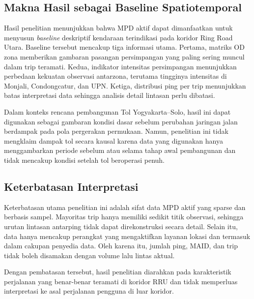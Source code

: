 \subsection{Makna Hasil sebagai Baseline Spatiotemporal}

Hasil penelitian menunjukkan bahwa MPD aktif dapat dimanfaatkan untuk menyusun \textit{baseline} deskriptif kendaraan terindikasi pada koridor Ring Road Utara. Baseline tersebut mencakup tiga informasi utama. Pertama, matriks OD zona memberikan gambaran pasangan persimpangan yang paling sering muncul dalam trip teramati. Kedua, indikator intensitas persimpangan menunjukkan perbedaan kekuatan observasi antarzona, terutama tingginya intensitas di Monjali, Condongcatur, dan UPN. Ketiga, distribusi ping per trip menunjukkan batas interpretasi data sehingga analisis detail lintasan perlu dibatasi.

Dalam konteks rencana pembangunan Tol Yogyakarta--Solo, hasil ini dapat digunakan sebagai gambaran kondisi dasar sebelum perubahan jaringan jalan berdampak pada pola pergerakan permukaan. Namun, penelitian ini tidak mengklaim dampak tol secara kausal karena data yang digunakan hanya menggambarkan periode sebelum atau selama tahap awal pembangunan dan tidak mencakup kondisi setelah tol beroperasi penuh.

\subsection{Keterbatasan Interpretasi}

Keterbatasan utama penelitian ini adalah sifat data MPD aktif yang sparse dan berbasis sampel. Mayoritas trip hanya memiliki sedikit titik observasi, sehingga urutan lintasan antarping tidak dapat direkonstruksi secara detail. Selain itu, data hanya mencakup perangkat yang mengaktifkan layanan lokasi dan termasuk dalam cakupan penyedia data. Oleh karena itu, jumlah ping, MAID, dan trip tidak boleh disamakan dengan volume lalu lintas aktual.

Dengan pembatasan tersebut, hasil penelitian diarahkan pada karakteristik perjalanan yang benar-benar teramati di koridor RRU dan tidak memperluas interpretasi ke asal perjalanan pengguna di luar koridor.
